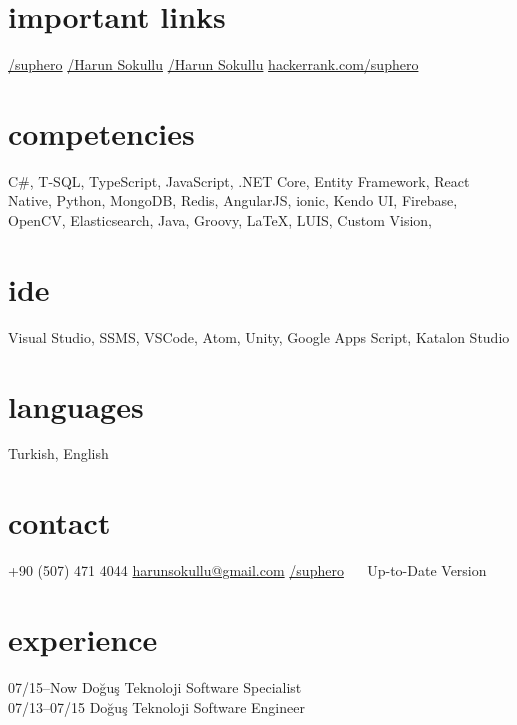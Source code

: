 \documentclass[]{../friggeri-cv} %
\begin{document}

\begin{aside}
\section{important links}
\href{https://github.com/suphero}{\faGithub/suphero}
\href{https://play.google.com/store/apps/developer?id=Harun+Sokullu}{\faAndroid/Harun Sokullu}
\href{https://itunes.apple.com/tr/developer/harun-sokullu/id1265151811}{\faApple/Harun Sokullu}
\href{https://www.hackerrank.com/suphero}{hackerrank.com/suphero}
\section{competencies}
C\#, T-SQL, TypeScript, JavaScript, .NET Core, Entity Framework, React Native, Python, MongoDB, Redis, AngularJS, ionic, Kendo UI, Firebase, OpenCV, Elasticsearch, Java, Groovy, \LaTeX, LUIS, Custom Vision, 
\section{ide}
Visual Studio, SSMS, VSCode, Atom, Unity, Google Apps Script, Katalon Studio
\section{languages}
Turkish, English
\section{contact}
+90 (507) 471 4044
\href{mailto:harunsokullu@gmail.com}{harunsokullu@gmail.com}
\href{https://www.linkedin.com/in/suphero}{\faLinkedin/suphero}
~~
Up-to-Date Version
\end{aside}

\section{experience}

\begin{entrylist}

\entry
{07/15--Now}
{Doğuş Teknoloji}{}
{Software Specialist}
\\
\entry
{07/13--07/15}
{Doğuş Teknoloji}{}
{Software Engineer}

\end{entrylist}
\end{document}
